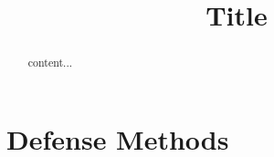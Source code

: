 \documentclass{article}
\begin{document}
\sloppy
	
	\def\x{{\mathbf x}}
	\def\L{{\cal L}}
	
	
	\title{Title}
	
	
	\address{$^{\#}$Rajshahi University of Engineering \& Technology, Rajshahi,  Bangladesh}
	
	\maketitle
	\begin{abstract}
		content...
	\end{abstract}
	
	\section{Defense Methods}
	\label{sec:Defense Methods}
	
\end{document}
